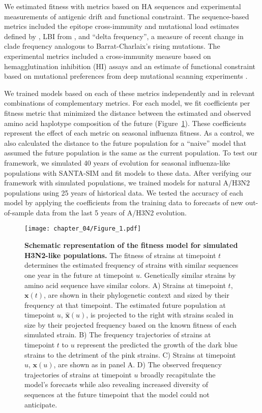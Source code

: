 We estimated fitness with metrics based on HA sequences and experimental measurements of antigenic drift and functional constraint.
The sequence-based metrics included the epitope cross-immunity and mutational load estimates defined by \citet{Luksza:2014hj}, LBI from \citet{Neher:2014eu}, and ``delta frequency'', a measure of recent change in clade frequency analogous to Barrat-Charlaix's rising mutations.
The experimental metrics included a cross-immunity measure based on hemagglutination inhibition (HI) assays \citep{Neher:2016hy} and an estimate of functional constraint based on mutational preferences from deep mutational scanning experiments \citep{Lee2018}.

We trained models based on each of these metrics independently and in relevant combinations of complementary metrics.
For each model, we fit coefficients per fitness metric that minimized the distance between the estimated and observed amino acid haplotype composition of the future (Figure~\ref{fig:model}).
These coefficients represent the effect of each metric on seasonal influenza fitness.
As a control, we also calculated the distance to the future population for a ``naive'' model that assumed the future population is the same as the current population.
To test our framework, we simulated 40 years of evolution for seasonal influenza-like populations with SANTA-SIM and fit models to these data.
After verifying our framework with simulated populations, we trained models for natural A/H3N2 populations using 25 years of historical data.
We tested the accuracy of each model by applying the coefficients from the training data to forecasts of new out-of-sample data from the last 5 years of A/H3N2 evolution.

\begin{figure}
  \begin{center}
  \texttt{[image: chapter\_04/Figure\_1.pdf]}
  \caption[{Schematic representation of the fitness model for simulated H3N2-like populations.}]{
    {\bf Schematic representation of the fitness model for simulated H3N2-like populations.}
    The fitness of strains at timepoint $t$ determines the estimated frequency of strains with similar sequences one year in the future at timepoint $u$.
    Genetically similar strains by amino acid sequence have similar colors.
    A) Strains at timepoint $t$, $\mathbf{x}(t)$, are shown in their phylogenetic context and sized by their frequency at that timepoint.
    The estimated future population at timepoint $u$, $\mathbf{\hat{x}}(u)$, is projected to the right with strains scaled in size by their projected frequency based on the known fitness of each simulated strain.
    B) The frequency trajectories of strains at timepoint $t$ to $u$ represent the predicted the growth of the dark blue strains to the detriment of the pink strains.
    C) Strains at timepoint $u$, $\mathbf{x}(u)$, are shown as in panel A.
    D) The observed frequency trajectories of strains at timepoint $u$ broadly recapitulate the model's forecasts while also revealing increased diversity of sequences at the future timepoint that the model could not anticipate.
  }
  \label{fig:model}
  \end{center}
\end{figure}

